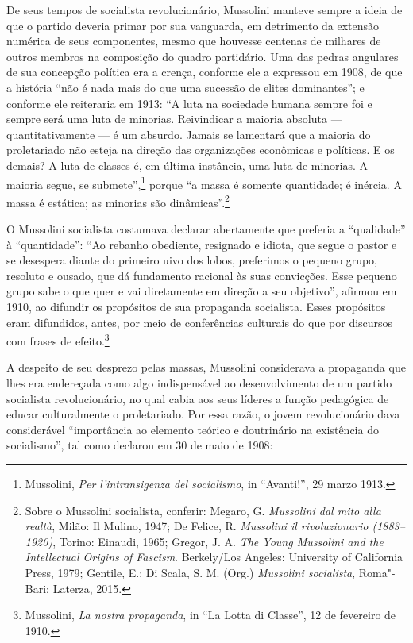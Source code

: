 De seus tempos de socialista revolucionário, Mussolini manteve sempre a
ideia de que o partido deveria primar por sua vanguarda, em detrimento
da extensão numérica de seus componentes, mesmo que houvesse centenas de
milhares de outros membros na composição do quadro partidário. Uma das
pedras angulares de sua concepção política era a crença, conforme ele a
expressou em 1908, de que a história ``não é nada mais do que uma
sucessão de elites dominantes''; e conforme ele reiteraria em 1913: ``A
luta na sociedade humana sempre foi e sempre será uma luta de minorias.
Reivindicar a maioria absoluta --- quantitativamente --- é um absurdo.
Jamais se lamentará que a maioria do proletariado não esteja na direção
das organizações econômicas e políticas. E os demais? A luta de classes
é, em última instância, uma luta de minorias. A maioria segue, se
submete'',\footnote{Mussolini, \emph{Per l'intransigenza del socialismo},
  in ``Avanti!'', 29 marzo 1913.} porque ``a massa é somente
quantidade; é inércia. A massa é estática; as minorias são
dinâmicas''.\footnote{Sobre o Mussolini socialista, conferir: Megaro, G.
  \emph{Mussolini dal mito alla realtà}, Milão: Il Mulino, 1947; De
  Felice, R. \emph{Mussolini il rivoluzionario (1883--1920)}, Torino:
  Einaudi, 1965; Gregor, J. A. \emph{The Young Mussolini and the
  Intellectual Origins of Fascism}. Berkely/Los Angeles: University of
  California Press, 1979; Gentile, E.; Di Scala, S. M. (Org.)
  \emph{Mussolini socialista}, Roma"-Bari: Laterza, 2015.}

O Mussolini socialista costumava declarar abertamente que preferia a
``qualidade'' à ``quantidade'': ``Ao rebanho obediente, resignado e
idiota, que segue o pastor e se desespera diante do primeiro uivo dos
lobos, preferimos o pequeno grupo, resoluto e ousado, que dá fundamento
racional às suas convicções. Esse pequeno grupo sabe o que quer e vai
diretamente em direção a seu objetivo'', afirmou em 1910, ao difundir os
propósitos de sua propaganda socialista. Esses propósitos eram
difundidos, antes, por meio de conferências culturais do que por
discursos com frases de efeito.\footnote{Mussolini, \emph{La nostra
  propaganda}, in ``La Lotta di Classe'', 12 de fevereiro de 1910.}

A despeito de seu desprezo pelas massas, Mussolini considerava a
propaganda que lhes era endereçada como algo indispensável ao
desenvolvimento de um partido socialista revolucionário, no qual cabia
aos seus líderes a função pedagógica de educar culturalmente o
proletariado. Por essa razão, o jovem revolucionário dava considerável
``importância ao elemento teórico e doutrinário na existência do
socialismo'', tal como declarou em 30 de maio de 1908:


